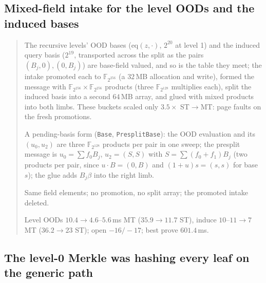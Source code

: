 \documentclass[11pt]{article}
\newcommand{\Fbig}{\mathbb{F}_{2^{128}}}
\newcommand{\eq}{\mathrm{eq}}
\newcommand{\code}[1]{\texttt{#1}}
\newenvironment{optsummary}{%
  \begin{quote}\small
  \begin{description}
  \setlength{\itemsep}{1pt}\setlength{\parsep}{0pt}\setlength{\topsep}{2pt}
}{%
  \end{description}
  \end{quote}
}
\begin{document}
\subsection{Mixed-field intake for the level OODs and the induced bases}\label{sec:mixedfield}

\begin{optsummary}
\item[Baseline:] The recursive levels' OOD bases ($\eq(z,\cdot)$, $2^{20}$ at level 1) and the induced query basis ($2^{19}$, transported across the split as the pairs $(B_j,0),(0,B_j)$) are base-field valued, and so is the table they meet; the intake promoted each to $\mathbb{F}_{2^{256}}$ (a $32\,$MB allocation and write), formed the message with $\mathbb{F}_{2^{256}}\times\mathbb{F}_{2^{256}}$ products (three $\Fbig$ multiplies each), split the induced basis into a second $64\,$MB array, and glued with mixed products into both limbs. These buckets scaled only $3.5\times$ ST$\to$MT: page faults on the fresh promotions.
\item[Improvement:] A pending-basis form (\code{Base}, \code{PresplitBase}): the OOD evaluation and its $(u_0,u_2)$ are three $\Fbig$ products per pair in one sweep; the presplit message is $u_0 = \sum f_0 B_j$, $u_2 = (S,S)$ with $S = \sum (f_0{+}f_1)B_j$ (two products per pair, since $u\cdot B = (0,B)$ and $(1{+}u)s = (s,s)$ for base $s$); the glue adds $B_j\beta$ into the right limb.
\item[Mechanism:] Same field elements; no promotion, no split array; the promoted intake deleted.
\item[Result:] Level OODs $10.4\to4.6$--$5.6\,$ms MT ($35.9\to11.7$ ST), induce $10$--$11\to7$ MT ($36.2\to23$ ST); open $-16/-17$; best prove $601.4\,$ms.
\end{optsummary}

\subsection{The level-0 Merkle was hashing every leaf on the generic path}\label{sec:leafbatch}
\end{document}
